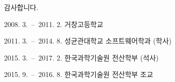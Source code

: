 \documentclass[master,english,final]{kaist-ucs}
\begin{document}

\acknowledgment[4]
    감사합니다.

\curriculumvitae[4]

    \begin{personaldata}
    \end{personaldata}

    \begin{education}
        \item[2008. 3.\ --\ 2011. 2.] 거창고등학교
        \item[2011. 3.\ --\ 2014. 8.] 성균관대학교 소프트웨어학과 (학사)
        \item[2015. 3.\ --\ 2017. 2.] 한국과학기술원 전산학부 (석사)
    \end{education}

    \begin{career}
        \item[2015. 9.\ --\ 2016. 8.] 한국과학기술원 전산학부 조교
    \end{career}

\end{document}
